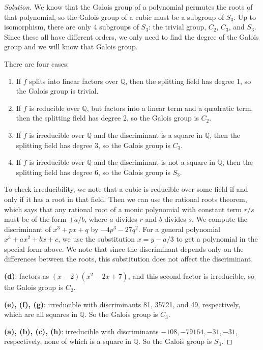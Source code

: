 \documentclass{article}
\newcommand{\Q}{\mathbb Q}
\begin{document}
\begin{proof}[Solution]
We know that the Galois group of a polynomial permutes the roots of that polynomial, so the Galois group of a cubic must be a subgroup of $S_3$. Up to isomorphism, there are only 4 subgroups of $S_3$: the trivial group, $C_2$, $C_3$, and $S_3$. Since these all have different orders, we only need to find the degree of the Galois group and we will know that Galois group. 

There are four cases:
\begin{enumerate}
\item If $f$ splits into linear factors over $\Q$, then the splitting field has degree 1, so the Galois group is trivial.
\item If $f$ is reducible over $\Q$, but factors into a linear term and a quadratic term, then the splitting field has degree 2, so the Galois group is $C_2$.
\item If $f$ is irreducible over $\Q$ and the discriminant is a square in $\Q$, then the splitting field has degree 3, so the Galois group is $C_3$. 
\item If $f$ is irreducible over $\Q$ and the discriminant is not a square in $\Q$, then the splitting field has degree 6, so the Galois group is $S_3$.
\end{enumerate} 

To check irreducibility, we note that a cubic is reducible over some field if and only if it has a root in that field. Then we can use the rational roots theorem, which says that any rational root of a monic polynomial with constant term $r/s$ must be of the form $\pm a/b$, where $a$ divides $r$ and $b$ divides $s$. We compute the discriminant of $x^3+px+q$ by $-4p^3-27q^2$. For a general polynomial $x^3+ax^2+bx+c$, we use the substitution $x=y-a/3$ to get a polynomial in the special form above. We note that since the discriminant depends only on the differences between the roots, this substitution does not affect the discriminant.

{\bf(d)}: factors as $(x-2)(x^2-2x+7)$, and this second factor is irreducible, so the Galois group is $C_2$. 

{\bf (e), (f), (g)}: irreducible with discriminants 81, 35721, and 49, respectively, which are all squares in $\Q$. So the Galois group is $C_3$.

{\bf (a), (b), (c), (h)}: irreducible with discriminants $-108, -79164, -31, -31$, respectively, none of which is a square in $\Q$. So the Galois group is $S_3$.  
\end{proof}
\end{document}

